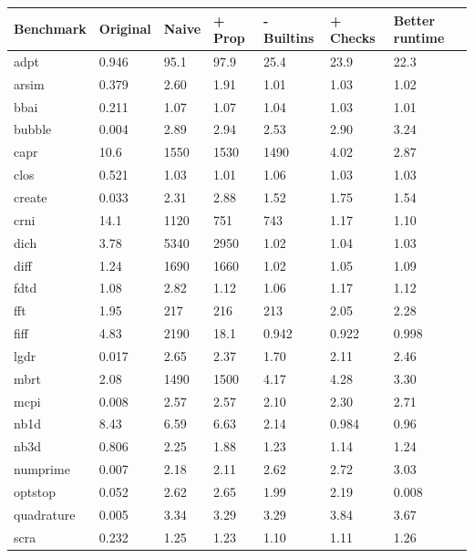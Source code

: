 \begin{table}
\begin{tabular}{| l | l | l | l | l | l | l |}
  \hline
  Benchmark & Original & Naive & + Prop & - Builtins & + Checks & Better runtime \\ \hline
  adpt        & 0.946 & 95.1 & 97.9 & 25.4 & 23.9 & 22.3  \\ \hline
  arsim       & 0.379 & 2.60 & 1.91 & 1.01 & 1.03 & 1.02  \\ \hline
  bbai        & 0.211 & 1.07 & 1.07 & 1.04 & 1.03 & 1.01  \\ \hline
  bubble      & 0.004 & 2.89 & 2.94 & 2.53 & 2.90 & 3.24  \\ \hline
  capr        & 10.6  & 1550 & 1530 & 1490 & 4.02 & 2.87  \\ \hline
  clos        & 0.521 & 1.03 & 1.01 & 1.06 & 1.03 & 1.03  \\ \hline
  create      & 0.033 & 2.31 & 2.88 & 1.52 & 1.75 & 1.54  \\ \hline
  crni        & 14.1  & 1120 & 751  & 743  & 1.17 & 1.10  \\ \hline
  dich        & 3.78  & 5340 & 2950 & 1.02 & 1.04 & 1.03  \\ \hline
  diff        & 1.24  & 1690 & 1660 & 1.02 & 1.05 & 1.09  \\ \hline
  fdtd        & 1.08  & 2.82 & 1.12 & 1.06 & 1.17 & 1.12  \\ \hline
  fft         & 1.95  & 217  & 216  & 213  & 2.05 & 2.28  \\ \hline
  fiff        & 4.83  & 2190 & 18.1 & 0.942& 0.922& 0.998 \\ \hline
  lgdr        & 0.017 & 2.65 & 2.37 & 1.70 & 2.11 & 2.46  \\ \hline
  mbrt        & 2.08  & 1490 & 1500 & 4.17 & 4.28 & 3.30  \\ \hline
  mcpi        & 0.008 & 2.57 & 2.57 & 2.10 & 2.30 & 2.71  \\ \hline
  nb1d        & 8.43  & 6.59 & 6.63 & 2.14 & 0.984& 0.96  \\ \hline
  nb3d        & 0.806 & 2.25 & 1.88 & 1.23 & 1.14 & 1.24  \\ \hline
  numprime    & 0.007 & 2.18 & 2.11 & 2.62 & 2.72 & 3.03  \\ \hline
  optstop     & 0.052 & 2.62 & 2.65 & 1.99 & 2.19 & 0.008 \\ \hline
  quadrature  & 0.005 & 3.34 & 3.29 & 3.29 & 3.84 & 3.67  \\ \hline
  scra        & 0.232 & 1.25 & 1.23 & 1.10 & 1.11 & 1.26  \\ \hline

\end{tabular}
\end{table}
